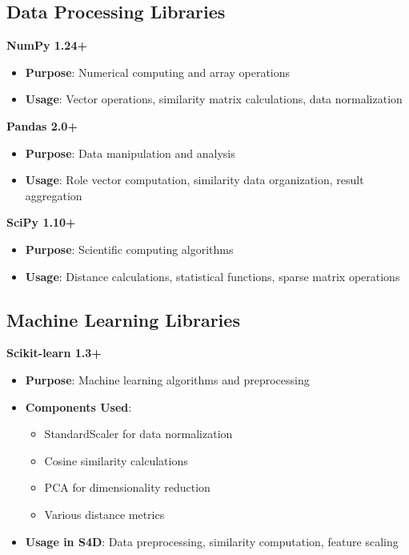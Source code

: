\subsection{Data Processing Libraries}
\label{subsec:data-processing}

\textbf{NumPy 1.24+}
\begin{itemize}
    \item \textbf{Purpose}: Numerical computing and array operations
    \item \textbf{Usage}: Vector operations, similarity matrix calculations, data normalization
\end{itemize}

\textbf{Pandas 2.0+}
\begin{itemize}
    \item \textbf{Purpose}: Data manipulation and analysis
    \item \textbf{Usage}: Role vector computation, similarity data organization, result aggregation
\end{itemize}

\textbf{SciPy 1.10+}
\begin{itemize}
    \item \textbf{Purpose}: Scientific computing algorithms
    \item \textbf{Usage}: Distance calculations, statistical functions, sparse matrix operations
\end{itemize}

\subsection{Machine Learning Libraries}
\label{subsec:ml-libraries}

\textbf{Scikit-learn 1.3+}
\begin{itemize}
    \item \textbf{Purpose}: Machine learning algorithms and preprocessing
    \item \textbf{Components Used}:
        \begin{itemize}
            \item StandardScaler for data normalization
            \item Cosine similarity calculations
            \item PCA for dimensionality reduction
            \item Various distance metrics
        \end{itemize}
    \item \textbf{Usage in S4D}: Data preprocessing, similarity computation, feature scaling
\end{itemize}

